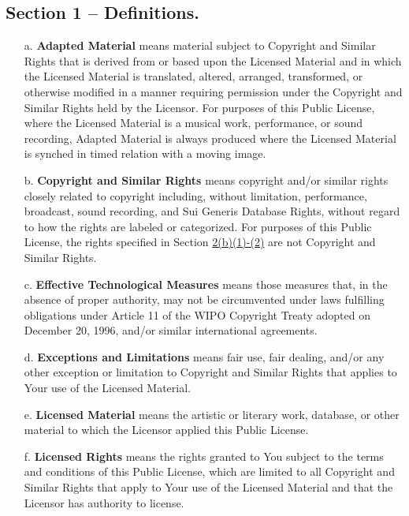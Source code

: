 \subsection*{Section 1 – Definitions.}
\begin{itemize}
\item[a.] \textbf{Adapted Material} means material subject to Copyright and Similar Rights that is derived from or based upon the Licensed Material and in which the Licensed Material is translated, altered, arranged, transformed, or otherwise modified in a manner requiring permission under the Copyright and Similar Rights held by the Licensor. For purposes of this Public License, where the Licensed Material is a musical work, performance, or sound recording, Adapted Material is always produced where the Licensed Material is synched in timed relation with a moving image.

\item[b.] \textbf{Copyright and Similar Rights} means copyright and/or similar rights closely related to copyright including, without limitation, performance, broadcast, sound recording, and Sui Generis Database Rights, without regard to how the rights are labeled or categorized. For purposes of this Public License, the rights specified in Section \href{https://creativecommons.org/licenses/by-nc-nd/4.0/legalcode#s2b}{2(b)(1)-(2)} are not Copyright and Similar Rights.

\item[c.] \textbf{Effective Technological Measures} means those measures that, in the absence of proper authority, may not be circumvented under laws fulfilling obligations under Article 11 of the WIPO Copyright Treaty adopted on December 20, 1996, and/or similar international agreements.

\item[d.] \textbf{Exceptions and Limitations} means fair use, fair dealing, and/or any other exception or limitation to Copyright and Similar Rights that applies to Your use of the Licensed Material.

\item[e.] \textbf{Licensed Material} means the artistic or literary work, database, or other material to which the Licensor applied this Public License.

\item[f.] \textbf{Licensed Rights} means the rights granted to You subject to the terms and conditions of this Public License, which are limited to all Copyright and Similar Rights that apply to Your use of the Licensed Material and that the Licensor has authority to license.


\end{itemize}
